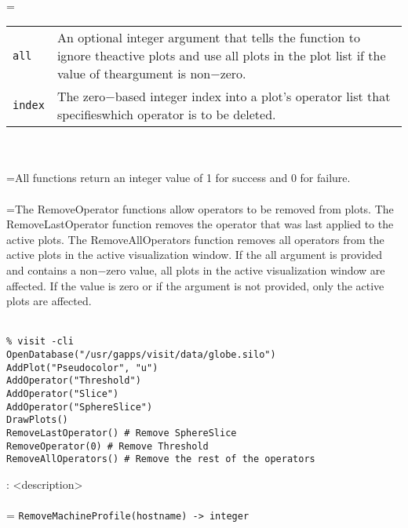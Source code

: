 \documentclass[10pt,a4paper]{report}
\begin{document}
 \\ 
\hangindent=\parindent 
\begin{tabular}{lp{9cm}}
\verb!all! & An optional integer argument that tells the function to ignore theactive plots and use all plots in the plot list if the value of theargument is non$-$zero. \\
\verb!index! & The zero$-$based integer index into a plot's operator list that specifieswhich operator is to be deleted. \\
\end{tabular} \\[-2mm]


 \\ 
\hangindent=\parindent All functions return an integer value of 1 for success and 0 for failure. \\[-3mm] 

 \\ 
\hangindent=\parindent The RemoveOperator functions allow operators to be removed from plots. The RemoveLastOperator function removes the operator that was last applied to the active plots. The RemoveAllOperators function removes all operators from the active plots in the active visualization window. If the all argument is provided and contains a non$-$zero value, all plots in the active visualization window are affected. If the value is zero or if the argument is not provided, only the active plots are affected. \\[-3mm] 

\\[-6mm]
\begin{verbatim}% visit -cli
OpenDatabase("/usr/gapps/visit/data/globe.silo")
AddPlot("Pseudocolor", "u")
AddOperator("Threshold")
AddOperator("Slice")
AddOperator("SphereSlice")
DrawPlots()
RemoveLastOperator() # Remove SphereSlice
RemoveOperator(0) # Remove Threshold
RemoveAllOperators() # Remove the rest of the operators
\end{verbatim}
\newpage


{}
: <description>\\[-3mm]

 \\ 
\hangindent=\parindent 
\verb!RemoveMachineProfile(hostname) -> integer!\\ [-3mm]
\end{document}
